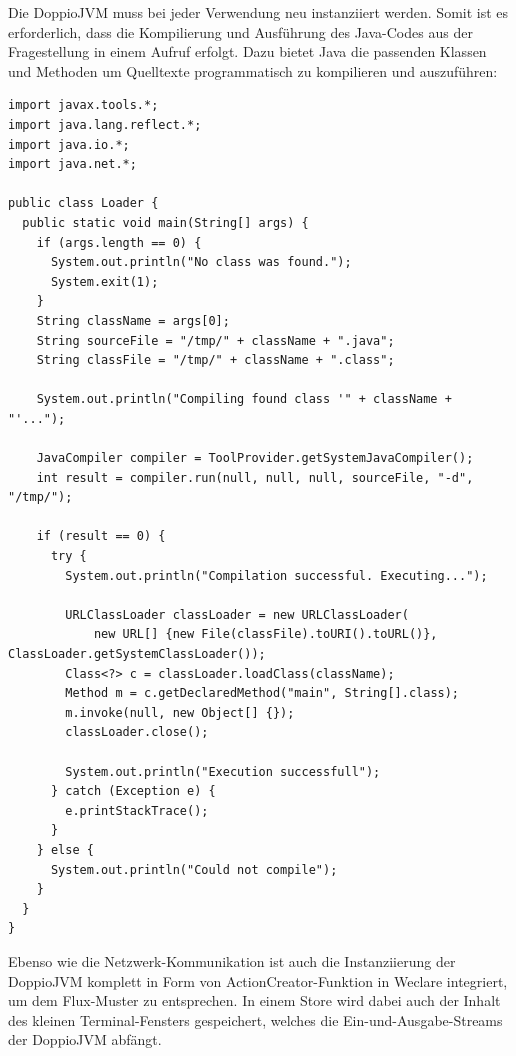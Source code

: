 Die DoppioJVM muss bei jeder Verwendung neu instanziiert werden. Somit ist es erforderlich, dass die Kompilierung und Ausführung des Java-Codes aus der Fragestellung in einem Aufruf erfolgt. Dazu bietet Java die passenden Klassen und Methoden um Quelltexte programmatisch zu kompilieren und auszuführen:

\begin{minipage}{\linewidth}
\begin{lstlisting}[caption={Java-Loader, der programmatisch Quelltext kompiliert und ausführt. (aus: public/doppio/Loader.java)}]
import javax.tools.*;
import java.lang.reflect.*;
import java.io.*;
import java.net.*;

public class Loader {
  public static void main(String[] args) {
    if (args.length == 0) {
      System.out.println("No class was found.");
      System.exit(1);
    }
    String className = args[0];
    String sourceFile = "/tmp/" + className + ".java";
    String classFile = "/tmp/" + className + ".class";

    System.out.println("Compiling found class '" + className + "'...");

    JavaCompiler compiler = ToolProvider.getSystemJavaCompiler();
    int result = compiler.run(null, null, null, sourceFile, "-d", "/tmp/");

    if (result == 0) {
      try {
        System.out.println("Compilation successful. Executing...");

        URLClassLoader classLoader = new URLClassLoader(
            new URL[] {new File(classFile).toURI().toURL()}, ClassLoader.getSystemClassLoader());
        Class<?> c = classLoader.loadClass(className);
        Method m = c.getDeclaredMethod("main", String[].class);
        m.invoke(null, new Object[] {});
        classLoader.close();

        System.out.println("Execution successfull");
      } catch (Exception e) {
        e.printStackTrace();
      }
    } else {
      System.out.println("Could not compile");
    }
  }
}
\end{lstlisting}
\end{minipage}

Ebenso wie die Netzwerk-Kommunikation ist auch die Instanziierung der DoppioJVM komplett in Form von ActionCreator-Funktion in Weclare integriert, um dem Flux-Muster zu entsprechen. In einem Store wird dabei auch der Inhalt des kleinen Terminal-Fensters gespeichert, welches die Ein-und-Ausgabe-Streams der DoppioJVM abfängt.

